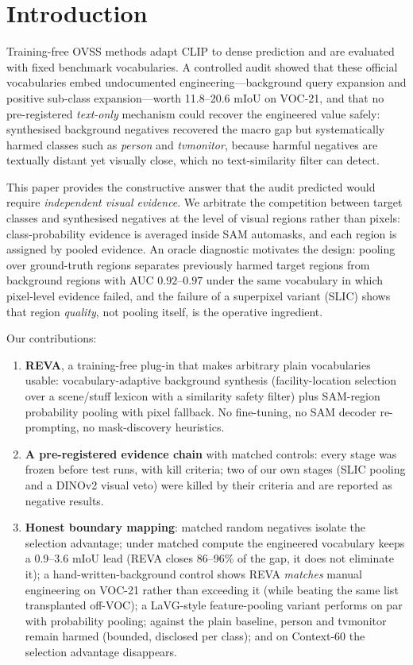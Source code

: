 \documentclass[11pt]{article}
\newcommand{\miou}{mIoU}
\newcommand{\reva}{REVA}
\begin{document}
\section{Introduction}

Training-free OVSS methods \citep{zhou2022maskclip,wang2024sclip,lan2024clearclip,
hajimiri2024naclip} adapt CLIP \citep{radford2021clip} to dense prediction and are
evaluated with fixed benchmark vocabularies. A controlled audit
\citep{sam2026fragile} showed that these official vocabularies embed undocumented
engineering---background query expansion and positive sub-class expansion---worth
11.8--20.6 \miou{} on VOC-21, and that no pre-registered \emph{text-only} mechanism
could recover the engineered value safely: synthesised background negatives recovered
the macro gap but systematically harmed classes such as \emph{person} and
\emph{tvmonitor}, because harmful negatives are textually distant yet visually close,
which no text-similarity filter can detect.

This paper provides the constructive answer that the audit predicted would require
\emph{independent visual evidence}. We arbitrate the competition between target
classes and synthesised negatives at the level of visual regions rather than pixels:
class-probability evidence is averaged inside SAM \citep{kirillov2023sam} automasks,
and each region is assigned by pooled evidence. An oracle diagnostic motivates the
design: pooling over ground-truth regions separates previously harmed target regions
from background regions with AUC $0.92$--$0.97$ under the same vocabulary in which
pixel-level evidence failed, and the failure of a superpixel variant (SLIC) shows that
region \emph{quality}, not pooling itself, is the operative ingredient.

Our contributions:
\begin{enumerate}
\item \textbf{\reva{}}, a training-free plug-in that makes arbitrary plain
vocabularies usable: vocabulary-adaptive background synthesis (facility-location
selection over a scene/stuff lexicon with a similarity safety filter) plus SAM-region
probability pooling with pixel fallback. No fine-tuning, no SAM decoder re-prompting,
no mask-discovery heuristics.
\item \textbf{A pre-registered evidence chain} with matched controls: every stage was
frozen before test runs, with kill criteria; two of our own stages (SLIC pooling and a
DINOv2 visual veto) were killed by their criteria and are reported as negative
results.
\item \textbf{Honest boundary mapping}: matched random negatives isolate the
selection advantage; under matched compute the engineered vocabulary keeps a
0.9--3.6 \miou{} lead (\reva{} closes 86--96\% of the gap, it does not eliminate it); a
hand-written-background control shows \reva{} \emph{matches} manual engineering
on VOC-21 rather than exceeding it (while beating the same list transplanted
off-VOC); a LaVG-style feature-pooling variant performs on par with
probability pooling; against the plain baseline, person and tvmonitor remain harmed
(bounded, disclosed per class); and on Context-60 the selection advantage disappears.
\end{enumerate}
\end{document}
